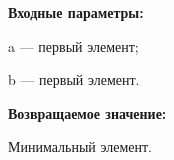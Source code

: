 \textbf{Входные параметры:}

 a --- первый элемент;
	
 b --- первый элемент.

\textbf{Возвращаемое значение:}

Минимальный элемент.